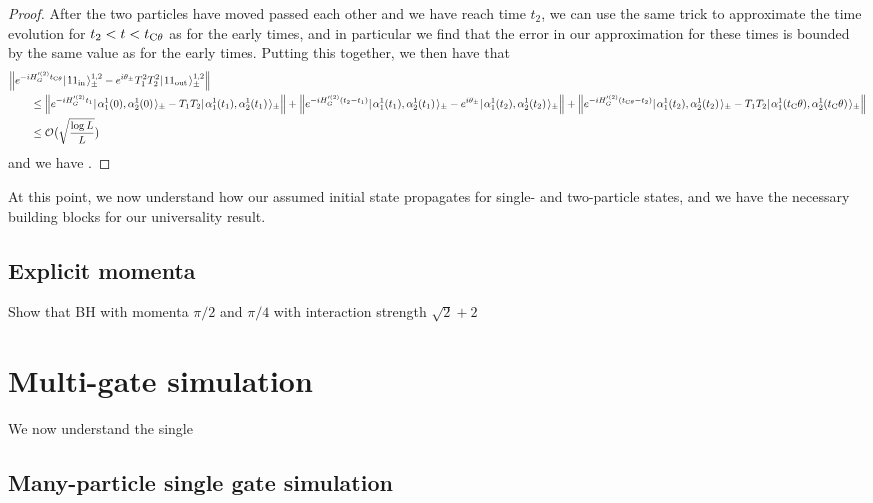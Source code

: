 \documentclass[../thesis-main/thesis-main]{subfiles}
\begin{document}
\begin{proof}
After the two particles have moved passed each other and we have reach time $t_2$, we can use the same trick to approximate the time evolution for $t_2 < t < t_{\mathrm{C}\theta}$ as for the early times, and in particular we find that the error in our approximation for these times is bounded by the same value as for the early times.  Putting this together, we then have that
\begin{align}
  &\Big\Vert e^{- i H_G'^{(2)} t_{\mathrm{C}\theta}} |\mspace{2mu} 11_{\text{in}} \mspace{2mu} \rangle^{1,2}_{\pm} - e^{i\theta_{\pm}} T_1^2 T_2^2 |\mspace{2mu} 11_{\text{out}} \mspace{2mu} \rangle_{\pm}^{1,2}\Big\Vert\\
  & \qquad \leq \Big \Vert e^{-i H_G'^{(2)} t_{1}} |\mspace{2mu} \alpha_1^1(0),\alpha_2^1(0) \mspace{2mu} \rangle_{\pm}  - T_1T_2|\mspace{2mu} \alpha_1^1(t_1),\alpha_2^1(t_1) \mspace{2mu} \rangle_{\pm} \Big \Vert 
  + \Big \Vert e^{-i H_G'^{(2)} (t_2 - t_{1})}|\mspace{2mu} \alpha_1^1(t_1),\alpha_2^1(t_1) \mspace{2mu} \rangle_{\pm} - e^{i\theta_{\pm}}|\mspace{2mu} \alpha_1^1(t_2),\alpha_2^1(t_2) \mspace{2mu} \rangle_{\pm} \Big \Vert 
  + \Big \Vert e^{-i H_G'^{(2)} (t_{\mathrm{C}\theta}-t_{2})}|\mspace{2mu} \alpha_1^1(t_2),\alpha_2^1(t_2) \mspace{2mu} \rangle_{\pm} - T_1T_2|\mspace{2mu} \alpha_1^1(t_\mathrm{C}\theta),\alpha_2^1(t_\mathrm{C}\theta) \mspace{2mu} \rangle_{\pm} \Big \Vert\\
  & \qquad \leq \mathcal{O}\big( \sqrt{\frac{\log L}{L}}\big)
\end{align}
and we have .
\end{proof}

At this point, we now understand how our assumed initial state propagates for single- and two-particle states, and we have the necessary building blocks for our universality result.  

\subsection{Explicit momenta}

Show that BH with momenta $\pi/2$ and $\pi/4$ with interaction strength $\sqrt{2} + 2$

%

\section{Multi-gate simulation}

We now understand the single

\subsection{Many-particle single gate simulation}
\end{document}
